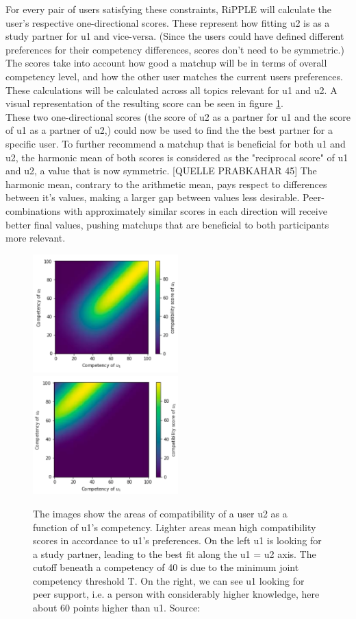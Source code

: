 \documentclass[nochapterpage,bigchapter,linedtoc,longdoc,colorback,accentcolor=tud3b,oneside]{tudreport}
\begin{document}
For every pair of users satisfying these constraints, RiPPLE will calculate the user's respective one-directional scores. These represent how fitting u2 is as a study partner for u1 and vice-versa. (Since the users could have defined different preferences for their competency differences, scores don't need to be symmetric.) The scores take into account how good a matchup will be in terms of overall competency level, and how the other user matches the current users preferences. These calculations will be calculated across all topics relevant for u1 and u2. A visual representation of the resulting score can be seen in figure \ref{f:Seeking}.\\
These two one-directional scores (the score of u2 as a partner for u1 and the score of u1 as a partner of u2,) could now be used to find the the best partner for a specific user. To further recommend a matchup that is beneficial for both u1 and u2, the harmonic mean of both scores is considered as the "reciprocal score" of u1 and u2, a value that is now symmetric. [QUELLE PRABKAHAR 45] The harmonic mean, contrary to the arithmetic mean, pays respect to differences between it's values, making a larger gap between values less desirable. Peer-combinations with approximately similar scores in each direction will receive better final values, pushing matchups that are beneficial to both participants more relevant.\\
\begin{figure}[h]
	\includegraphics[width=0.5\textwidth]{g/SeekingPartnerCompatibility.PNG}
	\includegraphics[width=0.5\textwidth]{g/SeekingSupportCompatibility.PNG}
	\caption{The images show the areas of compatibility of a user u2 as a function of u1's competency. Lighter areas mean high compatibility scores in accordance to u1's preferences. On the left u1 is looking for a study partner, leading to the best fit along the u1 = u2 axis. The cutoff beneath a competency of 40 is due to the minimum joint competency threshold T. On the right, we can see u1 looking for peer support, i.e. a person with considerably higher knowledge, here about 60 points higher than u1. Source: \cite{potts2018reciprocal}}
	\label{f:Seeking}
\end{figure}
\end{document}
